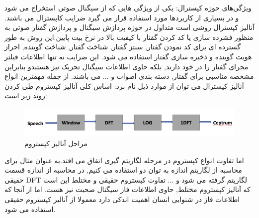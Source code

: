 \documentclass{article}
\begin{document}
ویژگی‌های حوزه کپسترال: \newline
یکی از ویژگی هایی که از سیگنال صوتی استخراج می شود و در بسیاری از کاربردها مورد استفاده قرار می گیرد ضرایب کاپسترال می باشند.\newline
آنالیز کپسترال  روشی است متداول در حوزه پردازش سیگنال و پردازش گفتار صوتی به منظور فشرده سازی یا کد کردن گفتار با کیفیت بالا در نرخ بیت  پایین.این روش به طور گسترده ای برای کد نمودن گفتار, سنتز گفتار, شناخت گفتار, شناخت گوینده, احراز هویت گوینده و ذخیره سازی گفتار استفاده می شود.\newline
این ضرایب نه تنها اطلاعات فیلتر مجرای گفتار را در خود دارند, بلکه حاوی اطلاعات سیگنال تحریک نیز هستندو بنابراین مشخصه مناسبی برای گفتار, دسته بندی اصوات و ... می باشند.\newline
از جمله مهمترین انواع آنالیز کپسترال می توان از موارد ذیل نام برد:\newline
{} \newline
{} \newline
{} \newline
{} \newline
اساس کلی آنالیز کپستروم طی کردن روند زیر است:
\begin{figure}[h]
	\centering
	\includegraphics[width=0.7\linewidth]{Photo/6}
	\caption[مراحل آنالیز کپستروم]{مراحل آنالیز کپستروم}
	\label{fig:6}
\end{figure}
اما تفاوت انواع کپستروم در مرحله لگاریتم گیری اتفاق می افتد.به عنوان مثال برای محاسبه  از لگاریتم اندازه به توان دو استفاده می کنیم, در محاسبه  از اندازه قسمت حقیقی DFT لگاریتم گرفته می شود و ...\newline
تفاوت کپستروم حقیقی و مختلط این است که آنالیز کپستروم مختلط, حاوی اطلاعات فاز سیگنال صحبت نیز هست. اما از آنجا که اطلاعات فاز در شنوایی انسان اهمیت اندکی دارد معمولا از آنالیز کپستروم حقیقی استفاده می شود.\newline
\end{document}
